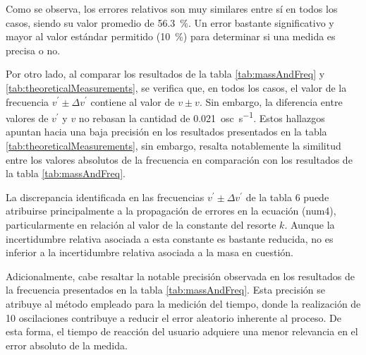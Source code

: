 \documentclass[../main.tex]{subfiles}
\begin{document}
Como se observa, los errores relativos son muy similares entre sí en todos los casos, siendo su valor promedio de \qty{56.3}{\percent}.
Un error bastante significativo y mayor al valor estándar permitido (\qty{10}{\percent}) para determinar si una medida es precisa o no.

Por otro lado, al comparar los resultados de la tabla \ref{tab:massAndFreq} y \ref{tab:theoreticalMeasurements}, se verifica que, en todos los casos, el valor de la frecuencia $\mathit{v^\prime} \pm \Delta \mathit{v^\prime}$ contiene al valor de $\mathit{v} \pm \mathit{v}$.
Sin embargo, la diferencia entre valores de $\mathit{v^\prime}$ y $\mathit{v}$ no rebasan la cantidad de \qty{0.021}{osc\per\second}.
Estos hallazgos apuntan hacia una baja precisión en los resultados presentados en la tabla \ref{tab:theoreticalMeasurements}, sin embargo, resalta notablemente la similitud entre los valores absolutos de la frecuencia en comparación con los resultados de la tabla \ref{tab:massAndFreq}.

La discrepancia identificada en las frecuencias $\mathit{v^\prime} \pm \Delta \mathit{v^\prime}$ de la tabla 6 puede atribuirse principalmente a la propagación de errores en la ecuación (num4), particularmente en relación al valor de la constante del resorte $k$.
Aunque la incertidumbre relativa asociada a esta constante es bastante reducida, no es inferior a la incertidumbre relativa asociada a la masa en cuestión.

Adicionalmente, cabe resaltar la notable precisión observada en los resultados de la frecuencia presentados en la tabla \ref{tab:massAndFreq}.
Esta precisión se atribuye al método empleado para la medición del tiempo, donde la realización de 10 oscilaciones contribuye a reducir el error aleatorio inherente al proceso.
De esta forma, el tiempo de reacción del usuario adquiere una menor relevancia en el error absoluto de la medida.
\end{document}
